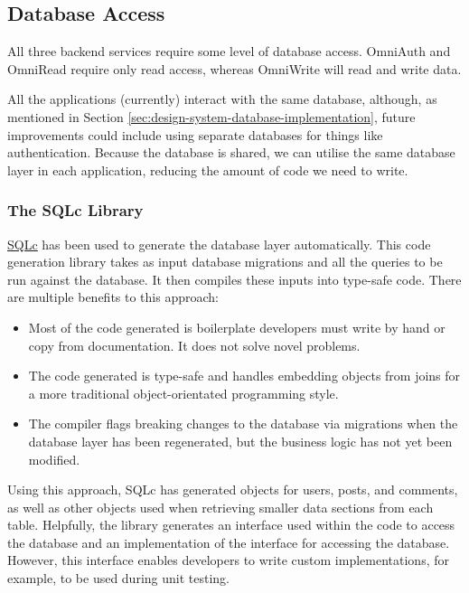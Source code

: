 \subsection{Database Access}
\label{sec:impl-backend-db}
All three backend services require some level of database access. OmniAuth and OmniRead require only read access, whereas OmniWrite will read and write data. 

All the applications (currently) interact with the same database, although, as mentioned in Section \ref{sec:design-system-database-implementation}, future improvements could include using separate databases for things like authentication.
Because the database is shared, we can utilise the same database layer in each application, reducing the amount of code we need to write.

\subsubsection{The SQLc Library}
\underline{\href{https://sqlc.dev}{SQLc}} \nocite{sqlc} has been used to generate the database layer automatically.
This code generation library takes as input database migrations and all the queries to be run against the database.
It then compiles these inputs into type-safe code. There are multiple benefits to this approach:
\begin{itemize}
    \item Most of the code generated is boilerplate developers must write by hand or copy from documentation. It does not solve novel problems.
    \item The code generated is type-safe and handles embedding objects from joins for a more traditional object-orientated programming style. 
    \item The compiler flags breaking changes to the database via migrations when the database layer has been regenerated, but the business logic has not yet been modified.
\end{itemize}
Using this approach, SQLc has generated objects for users, posts, and comments, as well as other objects used when retrieving smaller data sections from each table.
Helpfully, the library generates an interface used within the code to access the database and an implementation of the interface for accessing the database.
However, this interface enables developers to write custom implementations, for example, to be used during unit testing. 



